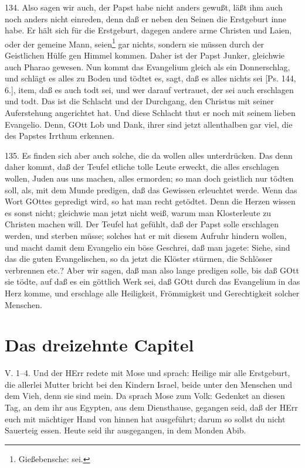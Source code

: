 134. Also sagen wir auch, der Papst habe nicht anders gewußt, läßt ihm auch noch anders nicht einreden, denn daß er neben den Seinen die Erstgeburt inne habe. Er hält sich für die Erstgeburt, dagegen andere arme Christen und Laien, oder der gemeine Mann, seien\footnote{Gießebensche: sei.} gar nichts, sondern sie müssen durch der Geistlichen Hülfe gen Himmel kommen. Daher ist der Papst Junker, gleichwie auch Pharao gewesen. Nun kommt das Evangelium gleich als ein Donnerschlag, und schlägt es alles zu Boden und tödtet es, sagt, daß es alles nichts sei [Ps. 144, 6.], item, daß es auch todt sei, und wer darauf vertrauet, der sei auch erschlagen und todt. Das ist die Schlacht und der Durchgang, den Christus mit seiner Auferstehung angerichtet hat. Und diese Schlacht thut er noch mit seinem lieben Evangelio. Denn, GOtt Lob und Dank, ihrer sind jetzt allenthalben gar viel, die des Papstes Irrthum erkennen.

135. Es finden sich aber auch solche, die da wollen alles unterdrücken. Das denn daher kommt, daß der Teufel etliche tolle Leute erweckt, die alles erschlagen wollen, Juden aus uns machen, alles ermorden; so man doch geistlich nur tödten soll, als, mit dem Munde predigen, daß das Gewissen erleuchtet werde. Wenn das Wort GOttes gepredigt wird, so hat man recht getödtet. Denn die Herzen wissen es sonst nicht; gleichwie man jetzt nicht weiß, warum man Klosterleute zu Christen machen will. Der Teufel hat gefühlt, daß der Papst solle erschlagen werden, und sterben müsse; solches hat er mit diesem Aufruhr hindern wollen, und macht damit dem Evangelio ein böse Geschrei, daß man jagete: Siehe, sind das die guten Evangelischen, so da jetzt die Klöster stürmen, die Schlösser verbrennen etc.? Aber wir sagen, daß man also lange predigen solle, bis daß GOtt sie tödte, auf daß es ein göttlich Werk sei, daß GOtt durch das Evangelium in das Herz komme, und erschlage alle Heiligkeit, Frömmigkeit und Gerechtigkeit solcher Menschen.

\section{Das dreizehnte Capitel}

\begin{schriftzitat}
V. 1–4. Und der HErr redete mit Mose und sprach: Heilige mir alle Erstgeburt, die allerlei Mutter bricht bei den Kindern Israel, beide unter den Menschen und dem Vieh, denn sie sind mein. Da sprach Mose zum Volk: Gedenket an diesen Tag, an dem ihr aus Egypten, aus dem Diensthause, gegangen seid, daß der HErr euch mit mächtiger Hand von hinnen hat ausgeführt; darum so sollst du nicht Sauerteig essen. Heute seid ihr ausgegangen, in dem Monden Abib.
\end{schriftzitat}

